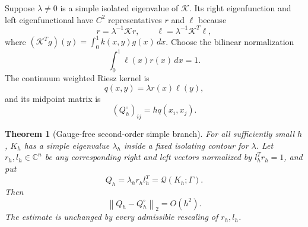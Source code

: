 \documentclass[11pt]{article}
\newtheorem{theorem}{Theorem}[section]
\theoremstyle{definition}
\theoremstyle{remark}
\newcommand{\norm}[1]{\left\lVert #1\right\rVert}
\newcommand{\C}{\mathbb C}
\newcommand{\cK}{\mathcal K}
\newcommand{\cQ}{\mathcal Q}
\begin{document}
Suppose $\lambda\ne0$ is a simple isolated eigenvalue of $\cK$.  Its right
eigenfunction and left eigenfunctional have $C^2$ representatives $r$ and
$\ell$ because
\[
 r=\lambda^{-1}\cK r,
 \qquad
 \ell=\lambda^{-1}\cK^T\ell,
\]
where
$(\cK^Tg)(y)=\int_0^1k(x,y)g(x)\,dx$.
Choose the bilinear normalization
\begin{equation}
 \int_0^1\ell(x)r(x)\,dx=1.
 \label{eq:continuum-normalization}
\end{equation}
The continuum weighted Riesz kernel is
\begin{equation}
 q(x,y)=\lambda r(x)\ell(y),
 \label{eq:continuum-weighted-kernel}
\end{equation}
and its midpoint matrix is
\begin{equation}
 (Q_h^\circ)_{ij}=h q(x_i,x_j).
 \label{eq:continuum-sampled-term}
\end{equation}

\begin{theorem}[Gauge-free second-order simple branch]
\label{thm:nystrom-weighted}
For all sufficiently small $h$, $K_h$ has a simple eigenvalue $\lambda_h$
inside a fixed isolating contour for $\lambda$.  Let $r_h,l_h\in\C^n$ be
any corresponding right and left vectors normalized by $l_h^Tr_h=1$, and
put
\begin{equation}
 Q_h=\lambda_h r_hl_h^T=\cQ(K_h;\Gamma).
 \label{eq:discrete-weighted-term}
\end{equation}
Then
\begin{equation}
 \norm{Q_h-Q_h^\circ}_2=O(h^2).
 \label{eq:nystrom-weighted-rate}
\end{equation}
The estimate is unchanged by every admissible rescaling of $r_h,l_h$.
\end{theorem}
\end{document}

